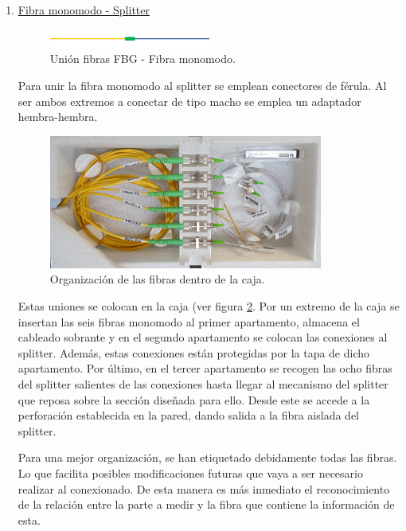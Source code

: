 \begin{itemize}
\begin{enumerate}
	
	\item \underline{Fibra monomodo - Splitter}
	
	\begin{figure}[H]
		\centering
		\includegraphics[width=0.5\textwidth]{./img/union2}
		\caption{Unión fibras FBG - Fibra monomodo.} 
		\label{fig:union2}
	\end{figure}  
	
	Para unir la fibra monomodo al splitter se emplean conectores de férula. Al ser ambos extremos a conectar de tipo macho se emplea un adaptador hembra-hembra. 
	
	\begin{figure}[H]
		\centering
		\includegraphics[width=0.85\textwidth]{./img/cajaOrden}
		\caption{Organización de las fibras dentro de la caja.} 
		\label{fig:CajaOrden}
	\end{figure}  
	
	Estas uniones se colocan en la caja (ver figura \ref{fig:CajaOrden}. Por un extremo de la caja se insertan las seis fibras monomodo al primer apartamento, almacena el cableado sobrante y en el segundo apartamento se colocan las conexiones al splitter. Además, estas conexiones están protegidas por la tapa de dicho apartamento. Por último, en el tercer apartamento se recogen las ocho fibras del splitter salientes de las conexiones hasta llegar al mecanismo del splitter que reposa sobre la sección diseñada para ello. Desde este se accede a la perforación establecida en la pared, dando salida a la fibra aislada del splitter.

	
	Para una mejor organización, se han etiquetado debidamente todas las fibras. Lo que facilita posibles modificaciones futuras que vaya a ser necesario realizar al conexionado. De esta manera es más inmediato el reconocimiento de la relación entre la parte a medir y la fibra que contiene la información de esta.
		

\end{enumerate}
\end{itemize}
